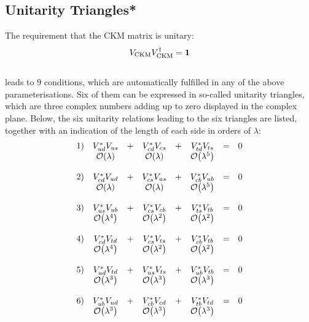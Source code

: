 \subsection{Unitarity Triangles*}
\label{sec:th.b.triangles}
The requirement that the CKM matrix is unitary:
\begin{equation}
V_{\mathrm{CKM}} V_{\mathrm{CKM}}^{\dagger} = \mathbf{1}
\end{equation}\\
 leads to 9 conditions, which are automatically fulfilled in any
 of the above parameterisations. Six of them can be expressed in
 so-called unitarity triangles, which are three complex numbers adding
 up to zero displayed in the complex plane. Below, the six unitarity
 relations leading to the six triangles are listed, together with an
 indication of the length of each side in orders of $\lambda$: {\small
\begin{equation}
\label{eq:CKMUnitarity}
\begin{array}{l c c c c c c c}
1)&V_{ud}^{\ast}V_{us}&+&V_{cd}^{\ast}V_{cs}&+&V_{td}^{\ast}V_{ts}&=&0\\
  & \order{\lambda}   & &\order{\lambda}    & & \order{\lambda^5} & & \\
  &                   & &                   & &                   & & \\
2)&V_{cd}^{\ast}V_{ud}&+&V_{cs}^{\ast}V_{us}&+&V_{cb}^{\ast}V_{ub}&=&0\\
  & \order{\lambda}   & &\order{\lambda}    & & \order{\lambda^5} & & \\
  &                   & &                   & &                   & & \\
3)&V_{us}^{\ast}V_{ub}&+&V_{cs}^{\ast}V_{cb}&+&V_{ts}^{\ast}V_{tb}&=&0\\
  & \order{\lambda^4} & &\order{\lambda^2}  & & \order{\lambda^2} & & \\
  &                   & &                   & &                   & & \\
4)&V_{cd}^{\ast}V_{td}&+&V_{cs}^{\ast}V_{ts}&+&V_{cb}^{\ast}V_{tb}&=&0\\
  & \order{\lambda^4} & &\order{\lambda^2}  & & \order{\lambda^2} & & \\
  &                   & &                   & &                   & & \\
5)&V_{ud}^{\ast}V_{td}&+&V_{us}^{\ast}V_{ts}&+&V_{ub}^{\ast}V_{tb}&=&0\\
  & \order{\lambda^3} & &\order{\lambda^3}  & & \order{\lambda^3} & & \\
  &                   & &                   & &                   & & \\
6)&V_{ub}^{\ast}V_{ud}&+&V_{cb}^{\ast}V_{cd}&+&V_{tb}^{\ast}V_{td}&=&0\\
  & \order{\lambda^3} & &\order{\lambda^3}  & & \order{\lambda^3} & & \\
  &                   & &                   & &                   & & \\
\end{array}
\end{equation}}\\
